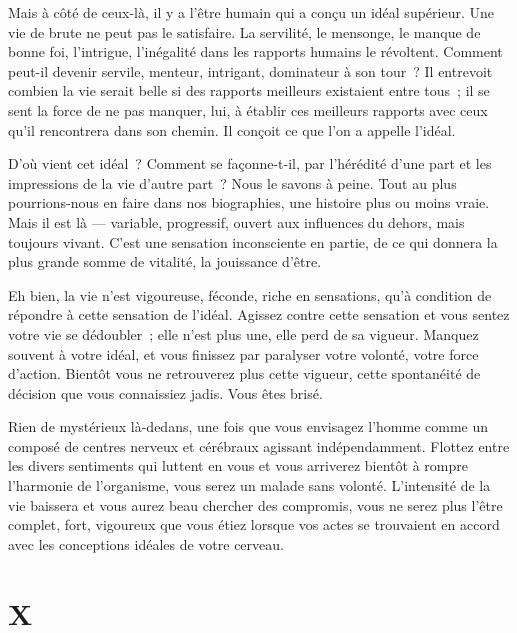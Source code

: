 \documentclass[french,twoside]{book} %
\begin{document}
Mais à côté de ceux-là, il y a l’être humain qui a conçu un idéal supérieur. Une vie de brute ne peut pas le satisfaire. La servilité, le mensonge, le manque de bonne foi, l’intrigue, l’inégalité dans les rapports humains le révoltent. Comment peut-il devenir servile, menteur, intrigant,  dominateur à son tour ? Il entrevoit combien la vie serait belle si des rapports meilleurs existaient entre tous ; il se sent la force de ne pas manquer, lui, à établir ces meilleurs rapports avec ceux qu’il rencontrera dans son chemin. Il conçoit ce que l’on a appelle l’idéal.\par
D’où vient cet idéal ? Comment se façonne-t-il, par l’hérédité d’une part et les impressions de la vie d’autre part ? Nous le savons à peine. Tout au plus pourrions-nous en faire dans nos biographies, une histoire plus ou moins vraie. Mais il est là — variable, progressif, ouvert aux influences du dehors, mais toujours vivant. C’est une sensation inconsciente en partie, de ce qui donnera la plus grande somme de vitalité, la jouissance d’être.\par
Eh bien, la vie n’est vigoureuse, féconde, riche en sensations, qu’à condition de répondre à cette sensation de l’idéal. Agissez contre cette sensation et vous sentez votre vie se dédoubler ; elle n’est plus une, elle perd de sa vigueur. Manquez souvent à votre idéal, et vous finissez par paralyser votre volonté, votre force d’action. Bientôt vous ne retrouverez plus cette vigueur, cette spontanéité de décision que vous connaissiez jadis. Vous êtes brisé.\par
Rien de mystérieux là-dedans, une fois que vous envisagez l’homme comme un composé de centres nerveux et cérébraux agissant indépendamment. Flottez entre les divers sentiments qui luttent en vous et vous arriverez bientôt à rompre l’harmonie de l’organisme, vous serez un malade sans volonté. L’intensité de la vie baissera et vous aurez beau chercher des compromis, vous ne serez plus l’être complet, fort, vigoureux que vous étiez lorsque vos actes se trouvaient en accord avec les conceptions idéales de votre cerveau.
\section[{X}]{X}
\label{p10}\renewcommand{\leftmark}{X}
\end{document}
